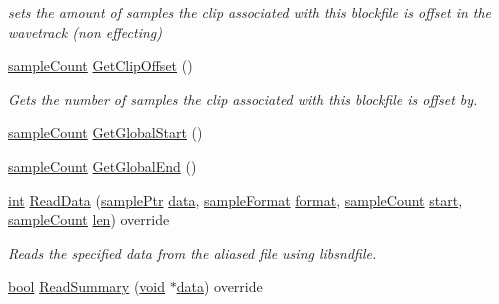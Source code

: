 \begin{DoxyCompactItemize}
\begin{DoxyCompactList}\small\item\em sets the amount of samples the clip associated with this blockfile is offset in the wavetrack (non effecting) \end{DoxyCompactList}\item 
\hyperlink{include_2audacity_2_types_8h_afa427e1f521ea5ec12d054e8bd4d0f71}{sample\+Count} \hyperlink{class_o_d_p_c_m_alias_block_file_a86bdfce755ba0804cd35482d77953e63}{Get\+Clip\+Offset} ()
\begin{DoxyCompactList}\small\item\em Gets the number of samples the clip associated with this blockfile is offset by. \end{DoxyCompactList}\item 
\hyperlink{include_2audacity_2_types_8h_afa427e1f521ea5ec12d054e8bd4d0f71}{sample\+Count} \hyperlink{class_o_d_p_c_m_alias_block_file_a58fcf2cd0d0fc31f3e6d9af91fbb49de}{Get\+Global\+Start} ()
\item 
\hyperlink{include_2audacity_2_types_8h_afa427e1f521ea5ec12d054e8bd4d0f71}{sample\+Count} \hyperlink{class_o_d_p_c_m_alias_block_file_a6f33dbe58c0ceb3c5ba760889a3e2a0e}{Get\+Global\+End} ()
\item 
\hyperlink{xmltok_8h_a5a0d4a5641ce434f1d23533f2b2e6653}{int} \hyperlink{class_o_d_p_c_m_alias_block_file_a52ff6c8c85016d45e39e33eea8956ba7}{Read\+Data} (\hyperlink{include_2audacity_2_types_8h_aaafb46d1caf7c79262fec96b577215fe}{sample\+Ptr} \hyperlink{lib_2expat_8h_ac39e72a1de1cb50dbdc54b08d0432a24}{data}, \hyperlink{include_2audacity_2_types_8h_a9938d2e2f6adef23e745cd80ef379792}{sample\+Format} \hyperlink{_export_p_c_m_8cpp_a317afff57d87a89158c2b038d37b2b08}{format}, \hyperlink{include_2audacity_2_types_8h_afa427e1f521ea5ec12d054e8bd4d0f71}{sample\+Count} \hyperlink{seqread_8c_ac503262ae470564980711da4f78b1181}{start}, \hyperlink{include_2audacity_2_types_8h_afa427e1f521ea5ec12d054e8bd4d0f71}{sample\+Count} \hyperlink{lib_2expat_8h_af86d325fecfc8f47b61fbf5a5146f582}{len}) override
\begin{DoxyCompactList}\small\item\em Reads the specified data from the aliased file using libsndfile. \end{DoxyCompactList}\item 
\hyperlink{mac_2config_2i386_2lib-src_2libsoxr_2soxr-config_8h_abb452686968e48b67397da5f97445f5b}{bool} \hyperlink{class_o_d_p_c_m_alias_block_file_abd6dc5b3aaa8b3ba396bb08cf4b29026}{Read\+Summary} (\hyperlink{sound_8c_ae35f5844602719cf66324f4de2a658b3}{void} $\ast$\hyperlink{lib_2expat_8h_ac39e72a1de1cb50dbdc54b08d0432a24}{data}) override

\end{DoxyCompactItemize}

